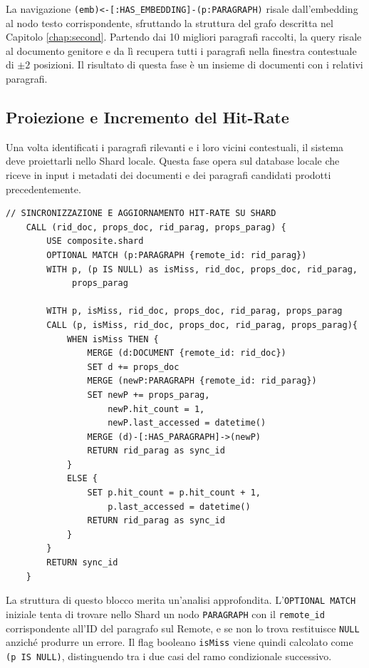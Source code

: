 La navigazione \texttt{(emb)<-[:HAS\_EMBEDDING]-(p:PARAGRAPH)} risale dall'embedding al nodo testo corrispondente, sfruttando la struttura del grafo descritta nel Capitolo \ref{chap:second}. Partendo dai 10 migliori paragrafi raccolti, la query risale al documento genitore e da lì recupera tutti i paragrafi nella finestra contestuale di $\pm 2$ posizioni. Il risultato di questa fase è un insieme di documenti con i relativi paragrafi.

\subsection{Proiezione e Incremento del Hit-Rate}

Una volta identificati i paragrafi rilevanti e i loro vicini contestuali, il sistema deve proiettarli nello Shard locale. Questa fase opera sul database locale che riceve in input i metadati dei documenti e dei paragrafi candidati prodotti precedentemente.

\begin{lstlisting}[language=Cypher, caption={Logica di Upsert e sincronizzazione dei nodi}, label=lst:upsert]
    // SINCRONIZZAZIONE E AGGIORNAMENTO HIT-RATE SU SHARD
    CALL (rid_doc, props_doc, rid_parag, props_parag) {
        USE composite.shard
        OPTIONAL MATCH (p:PARAGRAPH {remote_id: rid_parag})
        WITH p, (p IS NULL) as isMiss, rid_doc, props_doc, rid_parag,
             props_parag

        WITH p, isMiss, rid_doc, props_doc, rid_parag, props_parag
        CALL (p, isMiss, rid_doc, props_doc, rid_parag, props_parag){
            WHEN isMiss THEN {
                MERGE (d:DOCUMENT {remote_id: rid_doc})
                SET d += props_doc
                MERGE (newP:PARAGRAPH {remote_id: rid_parag})
                SET newP += props_parag,
                    newP.hit_count = 1,
                    newP.last_accessed = datetime()
                MERGE (d)-[:HAS_PARAGRAPH]->(newP)
                RETURN rid_parag as sync_id
            }
            ELSE {
                SET p.hit_count = p.hit_count + 1,
                    p.last_accessed = datetime()
                RETURN rid_parag as sync_id
            }
        }
        RETURN sync_id
    }
\end{lstlisting}

\newpage

La struttura di questo blocco merita un'analisi approfondita. L'\texttt{OPTIONAL MATCH} iniziale tenta di trovare nello Shard un nodo \texttt{PARAGRAPH} con il \texttt{remote\_id} corrispondente all'ID del paragrafo sul Remote, e se non lo trova restituisce \texttt{NULL} anziché produrre un errore. Il flag booleano \texttt{isMiss} viene quindi calcolato come \texttt{(p IS NULL)}, distinguendo tra i due casi del ramo condizionale successivo.

